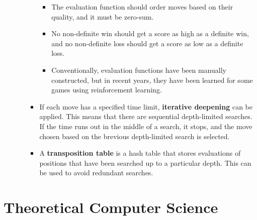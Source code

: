 \documentclass{article}
\begin{document}
\begin{itemize}
\begin{itemize}
\begin{itemize}
            \begin{itemize}
                \item The evaluation function should order moves based on their quality, and it must be zero-sum.
                \item No non-definite win should get a score as high as a definite win, and no non-definite loss should get a score as low as a definite loss.
                \item Conventionally, evaluation functions have been manually constructed, but in recent years, they have been learned for some games using reinforcement learning.
            \end{itemize}
            \item If each move has a specified time limit, \textbf{iterative deepening} can be applied. This means that there are sequential depth-limited searches. If the time runs out in the middle of a search, it stops, and the move chosen based on the brevious depth-limited search is selected.
            \item A \textbf{transposition table} is a hash table that stores evaluations of positions that have been searched up to a particular depth. This can be used to avoid redundant searches.
        \end{itemize}
    \end{itemize}
\end{itemize}
\section*{Theoretical Computer Science}
\end{document}
